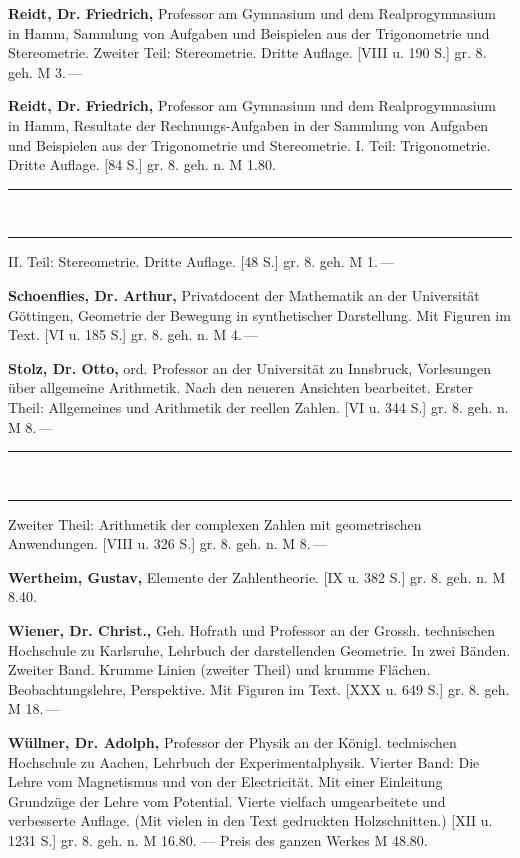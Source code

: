 \documentclass[11pt]{article}
\begin{document}
\textbf{Reidt, Dr. Friedrich,} Professor am Gymnasium und dem Realprogymnasium in
Hamm, Sammlung von Aufgaben und Beispielen aus der Trigonometrie und Stereometrie.
Zweiter Teil: Stereometrie. Dritte Auflage. [VIII u. 190 S.] gr. 8. geh. M 3.\,---


\textbf{Reidt, Dr. Friedrich,} Professor am Gymnasium und dem Realprogymnasium in
Hamm, Resultate der Rechnungs-Aufgaben in der Sammlung von Aufgaben und Beispielen
aus der Trigonometrie und Stereometrie. I. Teil: Trigonometrie. Dritte Auflage.
[84 S.] gr. 8. geh. n. M 1.80.

\rule{1.5em}{0.4pt}\ \rule{1.5em}{0.4pt} II. Teil: Stereometrie. Dritte Auflage.
[48 S.] gr. 8. geh. M 1.\,---

\textbf{Schoenflies, Dr. Arthur,} Privatdocent der Mathematik an der Universität
Göttingen, Geometrie der Bewegung in synthetischer Darstellung. Mit Figuren im Text.
[VI u. 185 S.] gr. 8. geh. n. M 4.\,---

\textbf{Stolz, Dr. Otto,} ord. Professor an der Universität zu Innsbruck,
Vorlesungen über allgemeine Arithmetik. Nach den neueren Ansichten bearbeitet.
Erster Theil: Allgemeines und Arithmetik der reellen Zahlen. [VI u. 344 S.] gr. 8.
geh. n. M 8.\,---

\rule{1.5em}{0.4pt}\ \rule{1.5em}{0.4pt} Zweiter Theil: Arithmetik der complexen
Zahlen mit geometrischen Anwendungen. [VIII u. 326 S.] gr. 8. geh. n. M 8.\,---

\textbf{Wertheim, Gustav,} Elemente der Zahlentheorie. [IX u. 382 S.] gr. 8. geh.
n. M 8.40.

\textbf{Wiener, Dr. Christ.,} Geh. Hofrath und Professor an der Grossh. technischen
Hochschule zu Karlsruhe, Lehrbuch der darstellenden Geometrie. In zwei Bänden.
Zweiter Band. Krumme Linien (zweiter Theil) und krumme Flächen. Beobachtungslehre,
Perspektive. Mit Figuren im Text. [XXX u. 649 S.] gr. 8. geh. M 18.\,---

\textbf{Wüllner, Dr. Adolph,} Professor der Physik an der Königl. technischen
Hochschule zu Aachen, Lehrbuch der Experimentalphysik. Vierter Band: Die Lehre vom
Magnetismus und von der Electricität. Mit einer Einleitung \glqq Grundzüge der Lehre
vom Potential\grqq{}. Vierte vielfach umgearbeitete und verbesserte Auflage. (Mit
vielen in den Text gedruckten Holzschnitten.) [XII u. 1231 S.] gr. 8. geh. n.
M 16.80. --- Preis des ganzen Werkes M 48.80.

\end{document}
